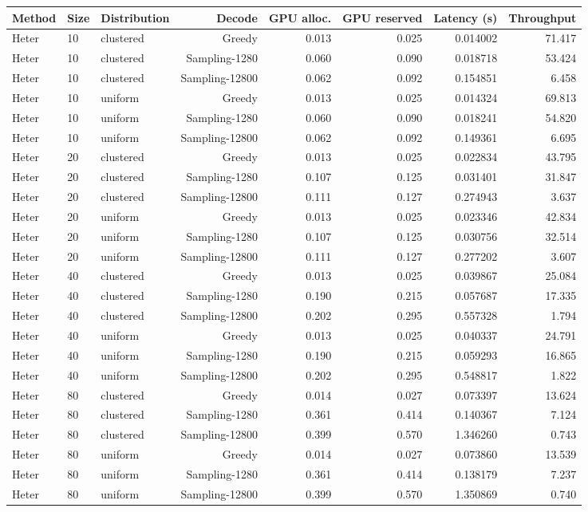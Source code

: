 \begin{tabular}{lllr rrrr}\toprule
Method & Size & Distribution & Decode & GPU alloc. & GPU reserved & Latency (s) & Throughput \\
\midrule
Heter & 10 & clustered & Greedy & 0.013 & 0.025 & 0.014002 & 71.417 \\
Heter & 10 & clustered & Sampling-1280 & 0.060 & 0.090 & 0.018718 & 53.424 \\
Heter & 10 & clustered & Sampling-12800 & 0.062 & 0.092 & 0.154851 & 6.458 \\
Heter & 10 & uniform & Greedy & 0.013 & 0.025 & 0.014324 & 69.813 \\
Heter & 10 & uniform & Sampling-1280 & 0.060 & 0.090 & 0.018241 & 54.820 \\
Heter & 10 & uniform & Sampling-12800 & 0.062 & 0.092 & 0.149361 & 6.695 \\
Heter & 20 & clustered & Greedy & 0.013 & 0.025 & 0.022834 & 43.795 \\
Heter & 20 & clustered & Sampling-1280 & 0.107 & 0.125 & 0.031401 & 31.847 \\
Heter & 20 & clustered & Sampling-12800 & 0.111 & 0.127 & 0.274943 & 3.637 \\
Heter & 20 & uniform & Greedy & 0.013 & 0.025 & 0.023346 & 42.834 \\
Heter & 20 & uniform & Sampling-1280 & 0.107 & 0.125 & 0.030756 & 32.514 \\
Heter & 20 & uniform & Sampling-12800 & 0.111 & 0.127 & 0.277202 & 3.607 \\
Heter & 40 & clustered & Greedy & 0.013 & 0.025 & 0.039867 & 25.084 \\
Heter & 40 & clustered & Sampling-1280 & 0.190 & 0.215 & 0.057687 & 17.335 \\
Heter & 40 & clustered & Sampling-12800 & 0.202 & 0.295 & 0.557328 & 1.794 \\
Heter & 40 & uniform & Greedy & 0.013 & 0.025 & 0.040337 & 24.791 \\
Heter & 40 & uniform & Sampling-1280 & 0.190 & 0.215 & 0.059293 & 16.865 \\
Heter & 40 & uniform & Sampling-12800 & 0.202 & 0.295 & 0.548817 & 1.822 \\
Heter & 80 & clustered & Greedy & 0.014 & 0.027 & 0.073397 & 13.624 \\
Heter & 80 & clustered & Sampling-1280 & 0.361 & 0.414 & 0.140367 & 7.124 \\
Heter & 80 & clustered & Sampling-12800 & 0.399 & 0.570 & 1.346260 & 0.743 \\
Heter & 80 & uniform & Greedy & 0.014 & 0.027 & 0.073860 & 13.539 \\
Heter & 80 & uniform & Sampling-1280 & 0.361 & 0.414 & 0.138179 & 7.237 \\
Heter & 80 & uniform & Sampling-12800 & 0.399 & 0.570 & 1.350869 & 0.740 \\
\bottomrule\end{tabular}
